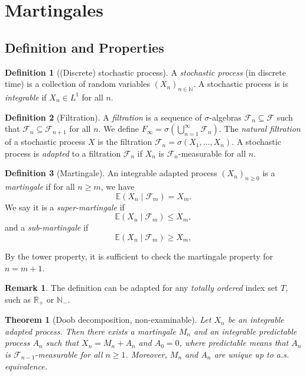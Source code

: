 \documentclass[parskip=full]{article}
\newtheorem{theorem}{Theorem}[section]
\theoremstyle{definition}
\newtheorem*{definition}{Definition}
\newtheorem*{remark}{Remark}
\newcommand{\R}{\mathbb{R}}
\newcommand{\N}{\mathbb{N}}
\newcommand{\1}{\mathbbm{1}}
\newcommand{\E}{\mathbb{E}}
\begin{document}
\section{Martingales}
\subsection{Definition and Properties}
\begin{definition}[(Discrete) stochastic process]
  A \emph{stochastic process} (in discrete time) is a collection of random variables $(X_n)_{n \in \mathbb{N}}$. A stochastic process is is \emph{integrable} if $X_n \in L^1$ for all $n$.
\end{definition}
\begin{definition}[Filtration]
  A \emph{filtration} is a sequence of $\sigma$-algebras $\mathcal{F}_n \subseteq \mathcal{F}$ such that $\mathcal{F}_n \subseteq \mathcal{F}_{n+1}$ for all $n$. We define $F_\infty = \sigma(\bigcup_{n=1}^\infty \mathcal{F}_n).$ The \emph{natural filtration} of a stochastic process $X$ is the filtration $\mathcal{F}_n = \sigma(X_1, \ldots, X_n)$. A stochastic process is \emph{adapted} to a filtration $\mathcal{F}_n$ if $X_n$ is $\mathcal{F}_n$-measurable for all $n$.
\end{definition}

\begin{definition}[Martingale]
  An integrable adapted process $(X_n)_{n \geq 0}$ is a \emph{martingale} if for all $n \geq m$, we have
  \[
    \E(X_n \mid \mathcal{F}_m) = X_m.
  \]
  We say it is a \emph{super-martingale} if
  \[
    \E(X_n \mid \mathcal{F}_m) \leq X_m,
  \]
  and a \emph{sub-martingale} if
  \[
    \E(X_n \mid \mathcal{F}_m) \geq X_m,
  \]
\end{definition}
By the tower property, it is sufficient to check the martingale property for $n = m+1$.

\begin{remark}
  The definition can be adapted for any \emph{totally ordered} index set $T$, such as $\R_+$ or $\N_-$.
\end{remark}

\begin{theorem}[Doob decomposition, non-examinable]
  Let $X_n$ be an integrable adapted process. Then there exists a martingale $M_n$ and an integrable predictable process $A_n$ such that $X_n = M_n + A_n$ and $A_0 = 0$, where predictable means that $A_n$ is $\mathcal{F}_{n-1}$-measurable for all $n \geq 1$. Moreover, $M_n$ and $A_n$ are unique up to a.s. equivalence.
\end{theorem}
\end{document}
